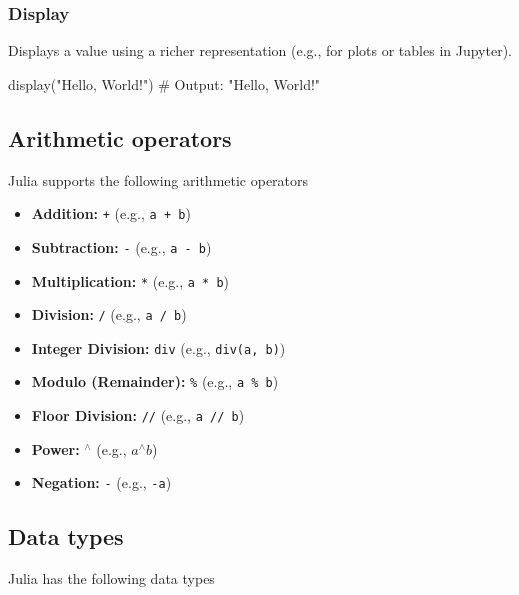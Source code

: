 \documentclass{report}
\begin{document}
    \subsubsection{Display}
    \bigbreak \noindent 
    Displays a value using a richer representation (e.g., for plots or tables in Jupyter).
    \bigbreak \noindent 
    \begin{jlcode}
    display("Hello, World!")  # Output: "Hello, World!"
    \end{jlcode}



    \pagebreak 
    \bigbreak \noindent 
    \subsection{Arithmetic operators}
    \bigbreak \noindent 
    Julia supports the following arithmetic operators
    \begin{itemize}
        \item \textbf{Addition:} \texttt{+} (e.g., \texttt{a + b})
        \item \textbf{Subtraction:} \texttt{-} (e.g., \texttt{a - b})
        \item \textbf{Multiplication:} \texttt{*} (e.g., \texttt{a * b})
        \item \textbf{Division:} \texttt{/} (e.g., \texttt{a / b})
        \item \textbf{Integer Division:} \texttt{div} (e.g., \texttt{div(a, b)})
        \item \textbf{Modulo (Remainder):} \texttt{\%} (e.g., \texttt{a \% b})
        \item \textbf{Floor Division:} \texttt{//} (e.g., \texttt{a // b})
        \item \textbf{Power:} \texttt{$^{\land}$} (e.g., \texttt{$a^{\land}b$})
        \item \textbf{Negation:} \texttt{-} (e.g., \texttt{-a})
    \end{itemize}
    \bigbreak \noindent 
    \subsection{Data types}
    \bigbreak \noindent 
    Julia has the following data types
    \bigbreak \noindent 
\end{document}
